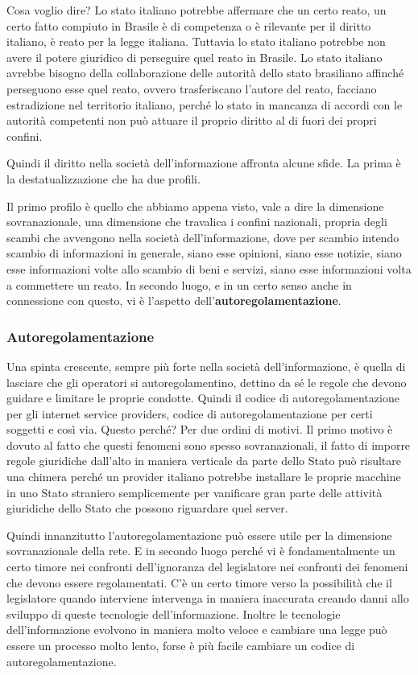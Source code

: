 Cosa voglio dire? Lo stato italiano potrebbe affermare che un certo reato, un certo fatto compiuto in Brasile è di competenza o è rilevante per il diritto italiano, è reato per la legge italiana. Tuttavia lo stato italiano potrebbe non avere il potere giuridico di perseguire quel reato in Brasile. Lo stato italiano avrebbe bisogno della collaborazione delle autorità dello stato brasiliano affinché perseguono esse quel reato, ovvero trasferiscano l'autore del reato, facciano estradizione nel territorio italiano, perché lo stato in mancanza di accordi con le autorità competenti non può  attuare il proprio diritto al di fuori dei propri confini.

Quindi il diritto nella società dell'informazione affronta alcune sfide. 
La prima è la destatualizzazione che ha due profili. 

Il primo profilo è quello che abbiamo appena visto, vale a dire la dimensione sovranazionale, una dimensione che travalica i confini nazionali, propria degli scambi che avvengono nella società dell'informazione, dove per scambio intendo scambio di informazioni in generale, siano esse opinioni, siano esse notizie, siano esse informazioni volte allo scambio di beni e servizi, siano esse informazioni volta a commettere un reato. In secondo luogo, e in un certo senso anche in connessione con questo, vi è l'aspetto dell'\textbf{autoregolamentazione}. 

\subsubsection{Autoregolamentazione}
Una spinta crescente, sempre più forte nella società dell'informazione, è quella di lasciare che gli operatori si autoregolamentino, dettino da sé le regole che devono guidare e limitare le proprie condotte. Quindi il codice di autoregolamentazione per gli internet service providers, codice di autoregolamentazione per certi soggetti e così via. 
Questo perché? Per due ordini di motivi. 
Il primo motivo è dovuto al fatto che questi fenomeni sono spesso sovranazionali, il fatto di imporre regole giuridiche dall'alto in maniera verticale da parte dello Stato può risultare una chimera perché un provider italiano potrebbe installare le proprie macchine in uno Stato straniero semplicemente per vanificare gran parte delle attività giuridiche dello Stato che possono riguardare quel server.

Quindi innanzitutto l'autoregolamentazione può essere utile per la dimensione sovranazionale della rete. E in secondo luogo perché vi è fondamentalmente un certo timore nei confronti dell'ignoranza del legislatore nei confronti dei fenomeni che devono essere regolamentati. C'è un certo timore verso la possibilità che il legislatore quando interviene intervenga in maniera inaccurata creando danni allo sviluppo di queste tecnologie dell'informazione. Inoltre le tecnologie dell'informazione evolvono in maniera molto veloce e cambiare una legge può essere un processo molto lento, forse è più facile cambiare un codice di autoregolamentazione.

